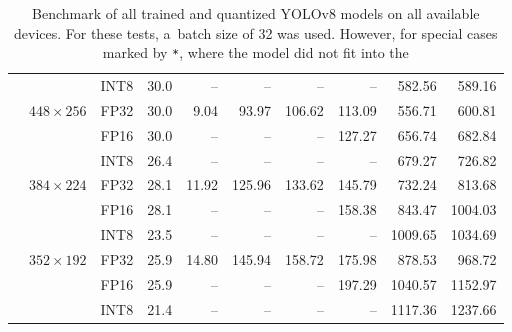 \begin{appendices}
\begin{table}
\begin{threeparttable}
\begin{tabular}{|c|c|c|c|rrrrrr|}
                                                                    &                                   & INT8 & 30.0 &    -- &     -- &     -- &     -- &  582.56 &  589.16 \\
            \cline{2-10}
                                                                    & \multirow{3}{*}{$448 \times 256$} & FP32 & 30.0 &  9.04 &  93.97 & 106.62 & 113.09 &  556.71 &  600.81 \\
                                                                    &                                   & FP16 & 30.0 &    -- &     -- &     -- & 127.27 &  656.74 &  682.84 \\
                                                                    &                                   & INT8 & 26.4 &    -- &     -- &     -- &     -- &  679.27 &  726.82 \\
            \cline{2-10}
                                                                    & \multirow{3}{*}{$384 \times 224$} & FP32 & 28.1 & 11.92 & 125.96 & 133.62 & 145.79 &  732.24 &  813.68 \\
                                                                    &                                   & FP16 & 28.1 &    -- &     -- &     -- & 158.38 &  843.47 & 1004.03 \\
                                                                    &                                   & INT8 & 23.5 &    -- &     -- &     -- &     -- & 1009.65 & 1034.69 \\
            \cline{2-10}
                                                                    & \multirow{3}{*}{$352 \times 192$} & FP32 & 25.9 & 14.80 & 145.94 & 158.72 & 175.98 &  878.53 &  968.72 \\
                                                                    &                                   & FP16 & 25.9 &    -- &     -- &     -- & 197.29 & 1040.57 & 1152.97 \\
                                                                    &                                   & INT8 & 21.4 &    -- &     -- &     -- &     -- & 1117.36 & 1237.66 \\
            \hline
            \end{tabular}
        \caption{Benchmark of all trained and quantized YOLOv8 models on all
        available devices. For these tests, a~batch size of 32 was used. However,
        for special cases marked by \texttt{*}, where the model did not fit into the
}
\end{threeparttable}
\end{table}
\end{appendices}
